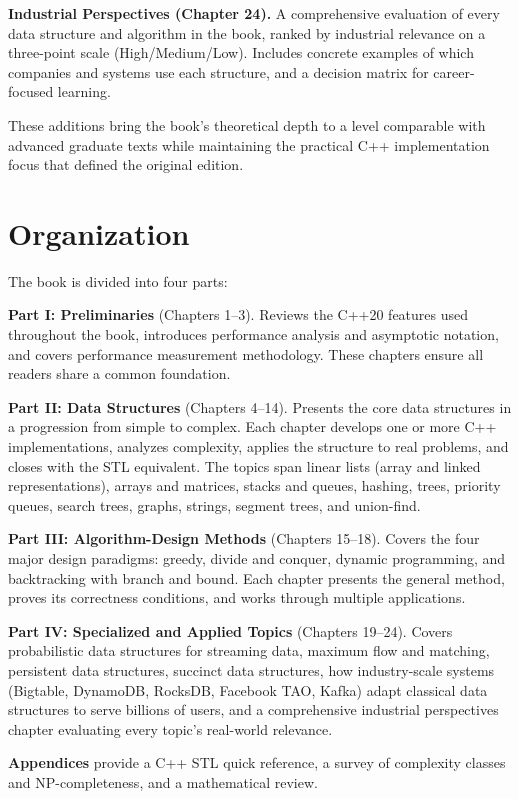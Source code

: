 \textbf{Industrial Perspectives (Chapter 24).} A comprehensive evaluation of every data structure and algorithm in the book, ranked by industrial relevance on a three-point scale (High/Medium/Low). Includes concrete examples of which companies and systems use each structure, and a decision matrix for career-focused learning.

These additions bring the book's theoretical depth to a level comparable with advanced graduate texts while maintaining the practical C++ implementation focus that defined the original edition.

\section{Organization}

The book is divided into four parts:

\textbf{Part I: Preliminaries} (Chapters 1–3). Reviews the C++20 features used throughout the book, introduces performance analysis and asymptotic notation, and covers performance measurement methodology. These chapters ensure all readers share a common foundation.

\textbf{Part II: Data Structures} (Chapters 4–14). Presents the core data structures in a progression from simple to complex. Each chapter develops one or more C++ implementations, analyzes complexity, applies the structure to real problems, and closes with the STL equivalent. The topics span linear lists (array and linked representations), arrays and matrices, stacks and queues, hashing, trees, priority queues, search trees, graphs, strings, segment trees, and union-find.

\textbf{Part III: Algorithm-Design Methods} (Chapters 15–18). Covers the four major design paradigms: greedy, divide and conquer, dynamic programming, and backtracking with branch and bound. Each chapter presents the general method, proves its correctness conditions, and works through multiple applications.

\textbf{Part IV: Specialized and Applied Topics} (Chapters 19–24). Covers probabilistic data structures for streaming data, maximum flow and matching, persistent data structures, succinct data structures, how industry-scale systems (Bigtable, DynamoDB, RocksDB, Facebook TAO, Kafka) adapt classical data structures to serve billions of users, and a comprehensive industrial perspectives chapter evaluating every topic's real-world relevance.

\textbf{Appendices} provide a C++ STL quick reference, a survey of complexity classes and NP-completeness, and a mathematical review.


